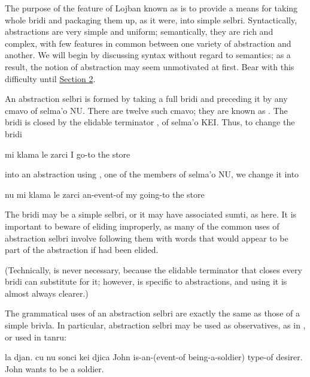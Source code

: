 The purpose of the feature of Lojban known as
     is to provide a means for taking whole bridi
    and packaging them up, as it were, into simple selbri.
    Syntactically, abstractions are very simple and uniform;
    semantically, they are rich and complex, with few features in
    common between one variety of abstraction and another. We will
    begin by discussing syntax without regard to semantics; as a
    result, the notion of abstraction may seem unmotivated at
    first. Bear with this difficulty until \hyperref[sec:11:2]{Section
    2}.

An abstraction selbri is formed by taking a full bridi and
    preceding it by any cmavo of selma'o NU. There are twelve such
    cmavo; they are known as . The bridi is closed
    by the elidable terminator , of selma'o KEI. Thus, to
    change the bridi
\begin{example}
mi klama le zarci\n
I go-to the store
\end{example}

{\noindent}into an abstraction using , one of the members of selma'o
    NU, we change it into
\begin{example}
nu mi klama le zarci \n
an-event-of my going-to the store
\end{example}

The bridi may be a simple selbri, or it may have associated
    sumti, as here. It is important to beware of eliding 
    improperly, as many of the common uses of abstraction selbri
    involve following them with words that would appear to be part
    of the abstraction if  had been elided. 

(Technically,  is never necessary, because the
    elidable terminator  that closes every bridi can
    substitute for it; however,  is specific to
    abstractions, and using it is almost always clearer.)

The grammatical uses of an abstraction selbri are exactly
    the same as those of a simple brivla. In particular,
    abstraction selbri may be used as observatives, as in , or used in tanru:
\begin{example}
la djan. cu nu sonci kei djica\n
John is-an-(event-of being-a-soldier) type-of desirer.\n
John wants to be a soldier.
\end{example}

